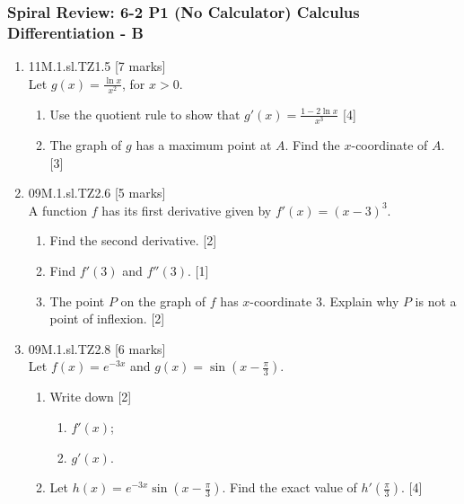 \documentclass[12pt, twoside]{article}
\begin{document}
\subsubsection*{Spiral Review: 6-2 P1 (No Calculator) Calculus Differentiation - B}
   \begin{enumerate}


   \item 11M.1.sl.TZ1.5 \hfill [7 marks]\\
   Let $g(x)= \frac{\ln x}{x^2}$, for $x>0$.
   \begin{enumerate}
     \item Use the quotient rule to show that $g'(x)= \frac{1-2\ln x}{x^3}$
     \hfill [4]
     \item The graph of $g$ has a maximum point at $A$. Find the $x$-coordinate of $A$. \hfill [3]
   \end{enumerate} \vspace{2cm}

   \item 09M.1.sl.TZ2.6 \hfill [5 marks]\\
   A function $f$ has its first derivative given by $f'(x)=(x-3)^3$.
   \begin{enumerate}
     \item Find the second derivative. \hfill [2]
     \item Find $f'(3)$ and $f''(3)$. \hfill [1]
     \item The point $P$ on the graph of $f$ has $x$-coordinate 3. Explain why $P$ is not a point of inflexion. \hfill [2]
   \end{enumerate} \vspace{2cm}

   \item 09M.1.sl.TZ2.8 \hfill [6 marks]\\
   Let $f(x)=e^{-3x}$ and $g(x)= \sin(x- \frac{\pi}{3})$.
   \begin{enumerate}
     \item Write down \hfill [2]
     \begin{enumerate}
       \item $f'(x)$;
       \item $g'(x)$.
     \end{enumerate}
     \item Let $h(x)=e^{-3x} \sin(x- \frac{\pi}{3})$. Find the exact value of $h'(\frac{\pi}{3})$. \hfill [4]
   \end{enumerate}

   \end{enumerate}
   \newpage
\end{document}
